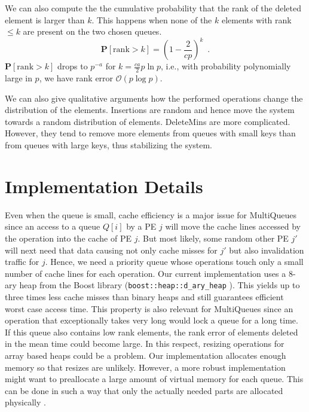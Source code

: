 \documentclass[a4paper,12pt]{article}
\newcommand{\prob}[1]{{\mathbf{P}}\left[#1\right]}
\newcommand{\Oh}[1]{\mathcal{O}\!\left( #1\right)}
\newcommand{\punkt}{\enspace .}
\begin{document}
We can also compute the the cumulative probability that the rank of the deleted element is larger than $k$. This happens when none of the $k$ elements with rank $\leq k$ are present on the two chosen queues. 
\begin{equation}\label{eq:tail}
\prob{\mathrm{rank}>k}=\left(1-\frac{2}{cp}\right)^k\punkt
\end{equation}
$\prob{\mathrm{rank}>k}$ drops to 
$p^{-a}$ for $k=\frac{ca}{2}p\ln p$, i.e., with probability polynomially large in $p$, we have rank error  $\Oh{p\log p}$.


We can also give qualitative arguments how the performed operations change the distribution of the elements. Insertions are random and hence move the system towards a random distribution of elements. DeleteMins are more complicated. 
However, they tend to remove more elements from queues with small keys than from queues with large keys, thus stabilizing the system. 



\section{Implementation Details}
\label{s:implementation}

Even when the queue is small, cache efficiency is a major issue for MultiQueues since an access to a queue $Q[i]$ by a PE $j$ will move the cache lines accessed by the operation into the cache of PE $j$. But most likely, some random other PE $j'$ will next need that data causing not only cache misses for $j'$ but also invalidation traffic for $j$. Hence, we need a priority queue whose operations touch only a small number of cache lines for each operation. Our current implementation uses a 8-ary heap from the Boost library ({\tt boost::heap::d\_ary\_heap} \cite{schling2011boost}). This yields up to three times less cache misses than binary heaps and still guarantees efficient worst case access time. This property is also relevant for MultiQueues since an operation that exceptionally takes very long would lock a queue for a long time.  If this queue also contains low rank elements, the rank error of elements deleted in the mean time could become large. In this respect, resizing operations for array based heaps could be a problem. Our implementation allocates enough memory so that resizes are unlikely. However, a more robust implementation might want to preallocate a large amount of virtual memory for each queue. This can be done in such a way that only the actually needed parts are allocated physically \cite{SanWas11}. 
\end{document}
